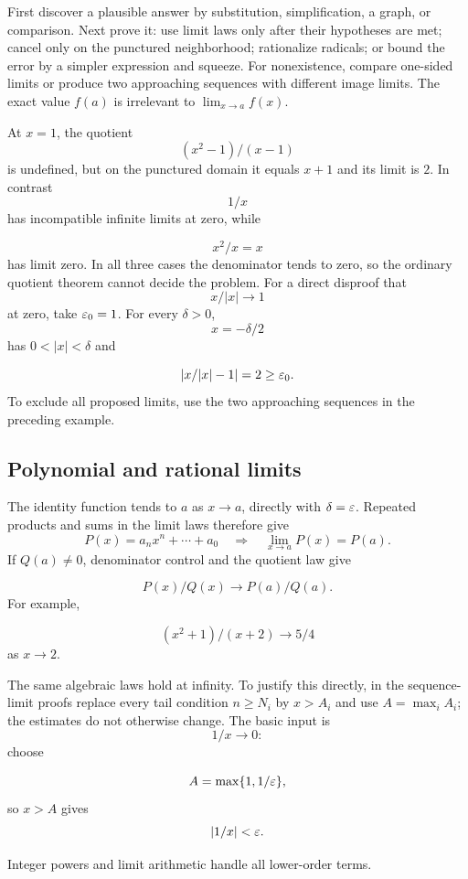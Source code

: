 \begin{remark}
First discover a plausible answer by substitution, simplification, a graph,
or comparison.  Next prove it: use limit laws only after their hypotheses
are met; cancel only on the punctured neighborhood; rationalize radicals;
or bound the error by a simpler expression and squeeze.  For nonexistence,
compare one-sided limits or produce two approaching sequences with
different image limits.  The exact value $f(a)$ is irrelevant to
$\lim_{x\to a}f(x)$.
\end{remark}

\begin{example}
At $x=1$, the quotient
\[
(x^2-1)/(x-1)
\]
 is undefined, but on the
punctured domain it equals $x+1$ and its limit is $2$.
In contrast
\[
1/x
\]
 has incompatible infinite limits at zero, while

\[
x^2/x=x
\]
 has limit zero. In all three cases the denominator tends
to zero, so the ordinary quotient theorem cannot decide the problem.
For a direct disproof that
\[
x/|x|\to1
\]
 at zero, take $\varepsilon_0=1$.
For every $\delta>0$,
\[
x=-\delta/2
\]
 has $0<|x|<\delta$ and

\[
|x/|x|-1|=2\geq\varepsilon_0.
\]
 To exclude all proposed limits, use the
two approaching sequences in the preceding example.
\end{example}

\subsection*{Polynomial and rational limits}
The identity function tends to $a$ as $x\to a$, directly with
$\delta=\varepsilon$. Repeated products and sums in the limit laws therefore give
\[
P(x)=a_nx^n+\cdots+a_0
\quad\Longrightarrow\quad\lim_{x\to a}P(x)=P(a).
\]
If $Q(a)\ne0$, denominator control and the quotient law give

\[
P(x)/Q(x)\to P(a)/Q(a).
\]
 For example,

\[
(x^2+1)/(x+2)\to5/4
\]
 as $x\to2$.

The same algebraic laws hold at infinity. To justify this directly,
in the sequence-limit proofs replace every tail condition $n\geq N_i$
by $x>A_i$ and use $A=\max_i A_i$; the estimates do not otherwise
change. The basic input is
\[
1/x\to0:
\]
 choose

\[
A=\max\{1,1/\varepsilon\},
\]
 so $x>A$ gives
\[
|1/x|<\varepsilon.
\]

Integer powers and limit arithmetic handle all lower-order terms.

